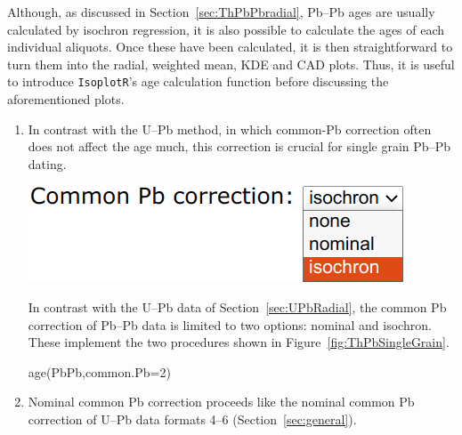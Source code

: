 \begin{refsection}
Although, as discussed in Section~\ref{sec:ThPbPbradial}, Pb--Pb ages
are usually calculated by isochron regression, it is also possible to
calculate the ages of each individual aliquots. Once these have been
calculated, it is then straightforward to turn them into the radial,
weighted mean, KDE and CAD plots. Thus, it is useful to introduce
\texttt{IsoplotR}'s age calculation function before discussing the
aforementioned plots.

\begin{enumerate}

\item In contrast with the U--Pb method, in which common-Pb correction
  often does not affect the age much, this correction is crucial for
  single grain Pb--Pb dating.
  
\noindent\begin{minipage}[t]{.35\linewidth}
\strut\vspace*{-\baselineskip}\newline
\includegraphics[width=\linewidth]{../figures/PbPbRadialPb0.png}
\end{minipage}
\begin{minipage}[t]{.65\linewidth}
  In contrast with the U--Pb data of Section~\ref{sec:UPbRadial}, the
  common Pb correction of Pb--Pb data is limited to two options:
  nominal and isochron. These implement the two procedures shown in
  Figure~\ref{fig:ThPbSingleGrain}.
\end{minipage}

\begin{console}
age(PbPb,common.Pb=2)
\end{console}

\item Nominal common Pb correction proceeds like the nominal common Pb
  correction of U--Pb data formats 4--6 (Section~\ref{sec:general}).


\end{enumerate}
\end{refsection}
